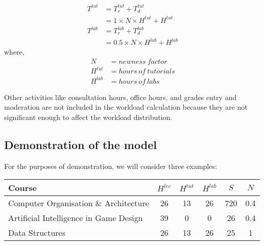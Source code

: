 \begin{equation}
  \label{eqn:total-workload-tut-lab}
  \begin{aligned}
    T^{tut} & = T_r^{tut} + T_d^{tut}                 \\
            & = 1 \times N \times H^{tut} + H^{tut}   \\
    T^{lab} & = T_r^{lab} + T_d^{lab}                 \\
            & = 0.5 \times N \times H^{lab} + H^{lab}
  \end{aligned}
\end{equation}
where,
\begin{equation}
  \nonumber
  \begin{aligned}
    N       & = newness\ factor      \\
    H^{tut} & = hours\ of\ tutorials \\
    H^{lab} & = hours\ of\ labs
  \end{aligned}
\end{equation}

Other activities like consultation hours, office hours, and grades entry and moderation are not included in the workload calculation because they are not significant enough to affect the workload distribution.

\subsection{Demonstration of the model}
\label{sec:workload_demo}

For the purposes of demonstration, we will consider three examples:

\begin{table}[ht]
  \centering
  \begin{tabular}{|l|c|c|c|c|c|}
    \hline
    \textbf{Course}                        & \(H^{lec}\) & \(H^{tut}\) & \(H^{lab}\) & \(S\) & \(N\) \\\hline
    Computer Organisation \& Architecture  & 26          & 13          & 26          & 720   & 0.4   \\\hline
    Artificial Intelligence in Game Design & 39          & 0           & 0           & 26    & 0.4   \\\hline
    Data Structures                        & 26          & 13          & 26          & 25    & 1     \\\hline
  \end{tabular}
\end{table}

